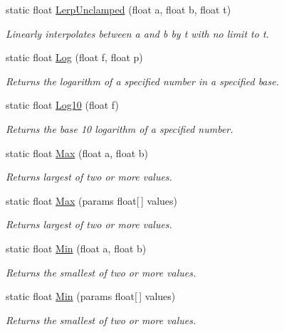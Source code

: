 \begin{DoxyCompactItemize}
static float \mbox{\hyperlink{class_lua_1_1_mathf_a2707664a0c93b38cece4445ee6750709}{Lerp\+Unclamped}} (float a, float b, float t)
\begin{DoxyCompactList}\small\item\em Linearly interpolates between a and b by t with no limit to t. \end{DoxyCompactList}\item 
static float \mbox{\hyperlink{class_lua_1_1_mathf_a9d1e276c7cfc8fe9f902ebda005e04e1}{Log}} (float f, float p)
\begin{DoxyCompactList}\small\item\em Returns the logarithm of a specified number in a specified base. \end{DoxyCompactList}\item 
static float \mbox{\hyperlink{class_lua_1_1_mathf_afcdb61fd1acfbe37c5e7a675421f3dc9}{Log10}} (float f)
\begin{DoxyCompactList}\small\item\em Returns the base 10 logarithm of a specified number. \end{DoxyCompactList}\item 
static float \mbox{\hyperlink{class_lua_1_1_mathf_ae0c3619a26a60fdc6442011911e0e412}{Max}} (float a, float b)
\begin{DoxyCompactList}\small\item\em Returns largest of two or more values. \end{DoxyCompactList}\item 
static float \mbox{\hyperlink{class_lua_1_1_mathf_ab683c60c60e63553655e8727a55f3e61}{Max}} (params float\mbox{[}$\,$\mbox{]} values)
\begin{DoxyCompactList}\small\item\em Returns largest of two or more values. \end{DoxyCompactList}\item 
static float \mbox{\hyperlink{class_lua_1_1_mathf_acc164cac8453f2551303265e346f4969}{Min}} (float a, float b)
\begin{DoxyCompactList}\small\item\em Returns the smallest of two or more values. \end{DoxyCompactList}\item 
static float \mbox{\hyperlink{class_lua_1_1_mathf_a1d580ef078dacb928fb6df039df2281b}{Min}} (params float\mbox{[}$\,$\mbox{]} values)
\begin{DoxyCompactList}\small\item\em Returns the smallest of two or more values. \end{DoxyCompactList}\item 

\end{DoxyCompactItemize}
